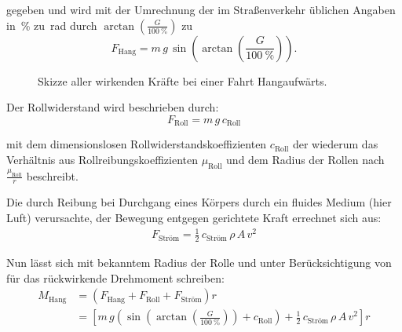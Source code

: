 	gegeben und wird mit der Umrechnung der im Straßenverkehr üblichen Angaben in~\unit{\percent} zu~\unit{\radian} durch \(\arctan\!\left(\frac{G}{\qty{100}{\percent}}\right)\) zu
	\begin{equation}
		F_\text{Hang} = m \, g \, \sin\!\left(\arctan\!\left(\frac{G}{\qty{100}{\percent}}\right)\right).%
		\label{eq:downhill force incline to radian}
	\end{equation}
	\begin{figure}[h]
		\centering
		
		\caption[Skizze aller wirkenden Kräfte bei einer Fahrt Hangaufwärts]{Skizze aller wirkenden Kräfte bei einer Fahrt Hangaufwärts.}%
		\label{fig:sketch torque incline}
	\end{figure}

	Der Rollwiderstand wird beschrieben durch:
	\begin{equation}
		F_\text{Roll} = m \, g \, c_\text{Roll}
		\label{eq:rolling resistance}
	\end{equation}%
	
	mit dem dimensionslosen Rollwiderstandskoeffizienten \(c_\text{Roll}\) der wiederum das Verhältnis aus Rollreibungskoeffizienten \(\mu_\text{Roll}\) und dem Radius der Rollen nach \(\frac{\mu_\text{Roll}}{r}\) beschreibt.\par\medskip
	Die durch Reibung bei Durchgang eines Körpers durch ein fluides Medium (hier Luft) verursachte, der Bewegung entgegen gerichtete Kraft errechnet sich aus:
	\begin{align}
		F_\text{Ström} = \frac{1}{2} \, c_\text{Ström} \, \rho \, A \, v^2
		\label{eq:air drag}
	\end{align}%

	Nun lässt sich mit bekanntem Radius der Rolle und unter Berücksichtigung von  für das rückwirkende Drehmoment schreiben:
	\begin{align}
		M_\text{Hang}	&= \left(F_\text{Hang} + F_\text{Roll} + F_\text{Ström}\right) r \nonumber \\
						&= \left[ m \, g \left( \sin\!\left(\arctan\!\left(\frac{G}{\qty{100}{\percent}}\right)\right) + c_\text{Roll} \right) + \frac{1}{2} \, c_\text{Ström} \, \rho \, A \, v^2 \right] r%
		\label{eq:incline plus roll plus drag torque}
	\end{align}%

